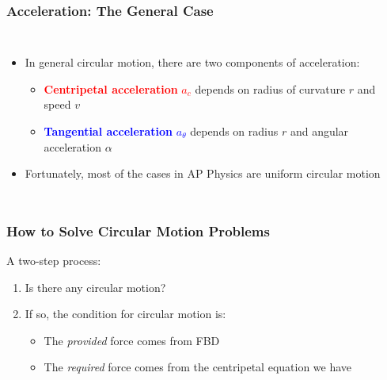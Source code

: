 \documentclass[12pt,compress,aspectratio=169]{beamer}
\newcommand{\mb}[1]{\ensuremath\mathbf{#1}}
\begin{document}
\begin{frame}
  \frametitle{Acceleration: The General Case}
  \begin{columns}
    \begin{itemize}
    \item In general circular motion, there are two components of acceleration:
      \begin{itemize}
      \item\textcolor{red}{\textbf{Centripetal acceleration} $a_c$} depends on
        radius of curvature $r$ and speed $v$
      \item \textcolor{blue}{\textbf{Tangential acceleration} $a_\theta$}
        depends on radius $r$  and angular acceleration $\alpha$
      \end{itemize}
    \item Fortunately, most of the cases in AP Physics are uniform circular
      motion
    \end{itemize}
  \end{columns}
\end{frame}


\begin{frame}
  \frametitle{How to Solve Circular Motion Problems}

  A two-step process:
  \begin{enumerate}
  \item Is there any circular motion?
  \item If so, the condition for circular motion is:

    \vspace{-0.2in}{\Large
      \begin{displaymath}
        \mb{F}_\mathrm{provided}=\mb{F}_\mathrm{required}
      \end{displaymath}
    }
    \begin{itemize}
    \item The \emph{provided} force comes from FBD
    \item The \emph{required} force comes from the centripetal equation we have
    \end{itemize}
  \end{enumerate}
\end{frame}
\end{document}
